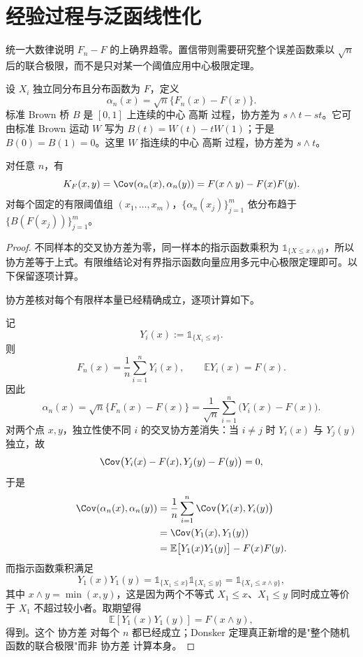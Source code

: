 \section{经验过程与泛函线性化}

统一大数律说明 $F_n-F$ 的上确界趋零。置信带则需要研究整个误差函数乘以 $\sqrt n$ 后的联合极限，而不是只对某一个阈值应用中心极限定理。

\begin{definition}
设 $X_i$ 独立同分布且分布函数为 $F$，定义
\[
 \alpha_n(x)=\sqrt n\{F_n(x)-F(x)\}.
\]
标准 Brown 桥 $B$ 是 $[0,1]$ 上连续的中心 高斯 过程，协方差为 $s\wedge t-st$。它可由标准 Brown 运动 $W$ 写为 $B(t)=W(t)-tW(1)$；于是 $B(0)=B(1)=0$。这里 $W$ 指连续的中心 高斯 过程，协方差为 $s\wedge t$。
\end{definition}

\begin{proposition}[经验过程的精确协方差与有限维极限]
对任意 $n$，有
\begin{equation}\label{eq:math-stat-brownian-bridge-covariance}
 K_F(x,y)=\Cov(\alpha_n(x),\alpha_n(y))
 =F(x\wedge y)-F(x)F(y).
\end{equation}
对每个固定的有限阈值组 $(x_1,\ldots,x_m)$，$\{\alpha_n(x_j)\}_{j=1}^m$ 依分布趋于 $\{B(F(x_j))\}_{j=1}^m$。
\end{proposition}
\begin{proof}
不同样本的交叉协方差为零，同一样本的指示函数乘积为 $\mathds{1}_{\{X\le x\wedge y\}}$，所以协方差等于上式。有限维结论对有界指示函数向量应用多元中心极限定理即可。以下保留逐项计算。

协方差核对每个有限样本量已经精确成立，逐项计算如下。

记
\[
Y_i(x):=\mathds{1}_{\{X_i\le x\}}.
\]
则
\[
F_n(x)=\frac1n\sum_{i=1}^nY_i(x),
\qquad
\mathbb E Y_i(x)=F(x).
\]
因此
\[
\alpha_n(x)
=\sqrt n\{F_n(x)-F(x)\}
=\frac1{\sqrt n}\sum_{i=1}^n
\bigl(Y_i(x)-F(x)\bigr).
\]
对两个点 $x,y$，独立性使不同 $i$ 的交叉协方差消失：当 $i\neq j$ 时 $Y_i(x)$ 与 $Y_j(y)$ 独立，故
\[
\Cov\bigl(Y_i(x)-F(x),Y_j(y)-F(y)\bigr)=0,
\]
于是
\[
\begin{aligned}
\Cov(\alpha_n(x),\alpha_n(y))
&=\frac1n\sum_{i=1}^n\Cov\bigl(Y_i(x),Y_i(y)\bigr)\\
&=\Cov(Y_1(x),Y_1(y))\\
&=\mathbb E\bigl[Y_1(x)Y_1(y)\bigr]-F(x)F(y).
\end{aligned}
\]
而指示函数乘积满足
\[
Y_1(x)Y_1(y)
=\mathds{1}_{\{X_1\le x\}}\mathds{1}_{\{X_1\le y\}}
=\mathds{1}_{\{X_1\le x\wedge y\}},
\]
其中 $x\wedge y=\min(x,y)$，这是因为两个不等式 $X_1\le x$、$X_1\le y$ 同时成立等价于 $X_1$ 不超过较小者。取期望得
\[
\mathbb E[Y_1(x)Y_1(y)]
=F(x\wedge y),
\]
得到。这个 协方差 对每个 $n$ 都已经成立；Donsker 定理真正新增的是"整个随机函数的联合极限"而非 协方差 计算本身。
\end{proof}

